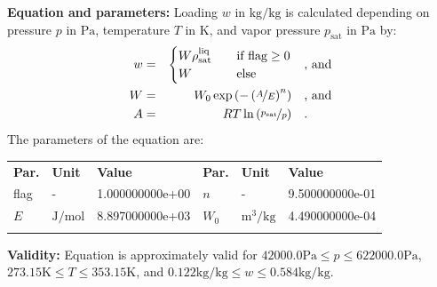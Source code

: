 \textbf{Equation and parameters:}
\newline
%
Loading $w$ in $\si{\kilogram\per\kilogram}$ is calculated depending on pressure $p$ in $\si{\pascal}$, temperature $T$ in $\si{\kelvin}$, and vapor pressure $p_\mathrm{sat}$ in $\si{\pascal}$ by:
%
\begin{equation*}
\begin{split}
w &=& \begin{cases} W \rho_\mathrm{sat}^{\mathrm{liq}} & \quad \text{if flag} \geq 0 \\ W & \quad \text{else} \end{cases} & \quad\text{, and} \\
W &=& W_0 \exp \left( - \left( \nicefrac{A}{E} \right) ^{n} \right) & \quad\text{, and} \\
A &=& R T \ln \left( \nicefrac{p_\mathrm{sat}}{p} \right) & \quad\text{.} \\
\end{split}
\end{equation*}
%
The parameters of the equation are:
%
\begin{longtable}[l]{lll|lll}
\toprule
\addlinespace
\textbf{Par.} & \textbf{Unit} & \textbf{Value} &	\textbf{Par.} & \textbf{Unit} & \textbf{Value} \\
\addlinespace
\midrule
\endhead

\bottomrule
\endfoot
\bottomrule
\endlastfoot
\addlinespace

flag & - & 1.000000000e+00 & $n$ & - & 9.500000000e-01 \\
$E$ & $\si{\joule\per\mole}$ & 8.897000000e+03 & $W_0$ & $\si{\cubic\meter\per\kilogram}$ & 4.490000000e-04 \\

\addlinespace\end{longtable}

\textbf{Validity:}
\newline
Equation is approximately valid for $42000.0 \si{\pascal} \leq p \leq 622000.0 \si{\pascal}$,  $273.15 \si{\kelvin} \leq T \leq 353.15 \si{\kelvin}$, and $0.122 \si{\kilogram\per\kilogram} \leq w \leq 0.584 \si{\kilogram\per\kilogram}$.
\newline

